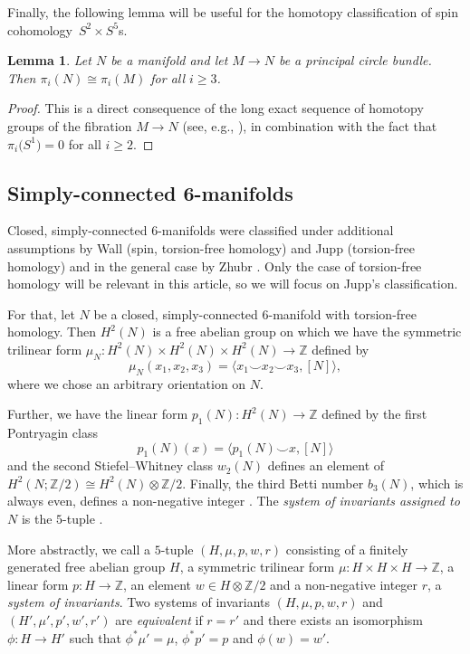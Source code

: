 \documentclass[10pt,a4paper]{amsart}
\numberwithin{equation}{section}
\newtheorem{Lemma}[Theorem]{Lemma}
\theoremstyle{definition}
\numberwithin{table}{section}
\newcommand{\Z}{\mathbb{Z}}
\begin{document}
Finally, the following lemma will be useful for the homotopy classification of spin cohomology~${S^2\times S^5}$s.
\begin{Lemma}\label{L:princ_circ_hom}
	Let $N$ be a manifold and let $M\to N$ be a principal circle bundle. Then $\pi_i(N)\cong\pi_i(M)$ for all $i\geq 3$.
\end{Lemma}
\begin{proof}
	This is a direct consequence of the long exact sequence of homotopy groups of the fibration $M\to N$ (see, e.g., \cite[Corollary 6.44]{DK01}), in combination with the fact that $\pi_i\bigl(S^1\bigr)=0$ for all $i\geq 2$.
\end{proof}

\subsection{Simply-connected 6-manifolds}

Closed, simply-connected $6$-manifolds were classified under additional assumptions by Wall \mbox{\cite{Wa66,Wa67}} (spin, torsion-free homology) and Jupp \cite{Ju73} (torsion-free homology) and in the general case by Zhubr \cite{Zu75,Zh00}. Only the case of torsion-free homology will be relevant in this article, so we will focus on Jupp's classification.

For that, let $N$ be a closed, simply-connected $6$-manifold with torsion-free homology. Then $H^2(N)$ is a free abelian group on which we have the symmetric trilinear form $\mu_N\colon H^2(N)\times H^2(N)\times H^2(N)\to \Z$ defined by
\[ \mu_N(x_1,x_2,x_3)=\langle x_1\smile x_2\smile x_3,[N]\rangle, \]
where we chose an arbitrary orientation on $N$.

Further, we have the linear form $p_1(N)\colon H^2(N)\to \Z$ defined by the first Pontryagin class
\[ p_1(N)(x)=\langle p_1(N)\smile x,[N]\rangle \]
and the second Stiefel--Whitney class $w_2(N)$ defines an element of $H^2(N;\Z/2)\cong H^2(N)\otimes\Z/2$. Finally, the third Betti number $b_3(N)$, which is always even, defines a non-negative integer .	The \emph{system of invariants assigned to $N$} is the $5$-tuple .

More abstractly, we call a $5$-tuple $(H,\mu,p,w,r)$ consisting of a finitely generated free abelian group $H$, a symmetric trilinear form $\mu\colon H\times H \times H\to \Z$, a linear form $p\colon H\to \Z$, an element $w\in H\otimes\Z/2$ and a non-negative integer $r$, a \emph{system of invariants}. Two systems of invariants $(H,\mu,p,w,r)$ and $(H',\mu',p',w',r')$ are \emph{equivalent} if $r=r'$ and there exists an isomorphism $\phi\colon H\to H'$ such that $\phi^*\mu'=\mu$, $\phi^* p'=p$ and $\phi(w)=w'$.
\end{document}
